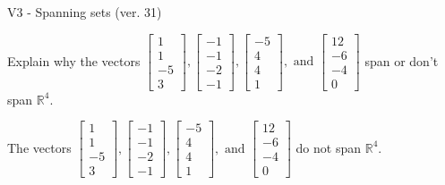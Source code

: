 \begin{exercise}
  \begin{exerciseTitle}V3 - Spanning sets (ver. 31)\end{exerciseTitle}
  \begin{exerciseStatement}
    Explain why the vectors \(\left[\begin{array}{r}
1 \\
1 \\
-5 \\
3
\end{array}\right] , \left[\begin{array}{r}
-1 \\
-1 \\
-2 \\
-1
\end{array}\right] , \left[\begin{array}{r}
-5 \\
4 \\
4 \\
1
\end{array}\right] , \text{ and } \left[\begin{array}{r}
12 \\
-6 \\
-4 \\
0
\end{array}\right]\) span or don't span \(\mathbb{R}^4\). 
	


  \end{exerciseStatement}
  \begin{exerciseAnswer}
   The vectors \(\left[\begin{array}{r}
1 \\
1 \\
-5 \\
3
\end{array}\right] , \left[\begin{array}{r}
-1 \\
-1 \\
-2 \\
-1
\end{array}\right] , \left[\begin{array}{r}
-5 \\
4 \\
4 \\
1
\end{array}\right] , \text{ and } \left[\begin{array}{r}
12 \\
-6 \\
-4 \\
0
\end{array}\right]\) 
  	 do not  
	span \(\mathbb{R}^4\).
  


  \end{exerciseAnswer}
\end{exercise}